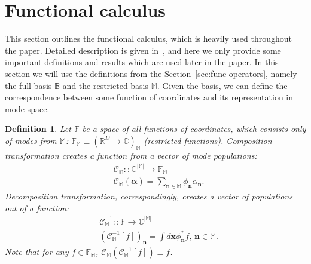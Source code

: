 \documentclass[12pt,aip,jmp,amssymb,amsmath]{revtex4-1}
\newtheorem{definition}{Definition}
\begin{document}
\section{Functional calculus}

This section outlines the functional calculus, which is heavily used throughout the paper.
Detailed description is given in~\cite{Dalton2011}, and here we only provide some important definitions and results which are used later in the paper.
In this section we will use the definitions from the Section~\ref{sec:func-operators}, namely the full basis $\mathbb{B}$ and the restricted basis $\mathbb{M}$.
Given the basis, we can define the correspondence between some function of coordinates and its representation in mode space.

\begin{definition}
    Let $\mathbb{F}$ be a space of all functions of coordinates, which consists only of modes from $\mathbb{M}$: $\mathbb{F}_{\mathbb{M}} \equiv (\mathbb{R}^D \rightarrow \mathbb{C})_{\mathbb{M}}$ (restricted functions).
    Composition transformation creates a function from a vector of mode populations:
    \begin{equation*}\begin{split}
        & \mathcal{C}_{\mathbb{M}} :: \mathbb{C}^{|\mathbb{M}|} \rightarrow \mathbb{F}_{\mathbb{M}} \\
        & \mathcal{C}_{\mathbb{M}}(\boldsymbol{\alpha}) = \sum_{\boldsymbol{n} \in \mathbb{M}} \phi_{\boldsymbol{n}} \alpha_{\boldsymbol{n}}.
    \end{split}\end{equation*}
    Decomposition transformation, correspondingly, creates a vector of populations out of a function:
    \begin{equation*}\begin{split}
        & \mathcal{C}_{\mathbb{M}}^{-1} :: \mathbb{F} \rightarrow \mathbb{C}^{|\mathbb{M}|} \\
        & (\mathcal{C}_{\mathbb{M}}^{-1}[f])_{\boldsymbol{n}}
        = \int d\boldsymbol{x} \phi_{\boldsymbol{n}}^* f,\,{\boldsymbol{n}} \in \mathbb{M}.
    \end{split}\end{equation*}
    Note that for any $f \in \mathbb{F}_{\mathbb{M}}$, $\mathcal{C}_{\mathbb{M}}(\mathcal{C}_{\mathbb{M}}^{-1}[f]) \equiv f$.
\end{definition}
\end{document}
